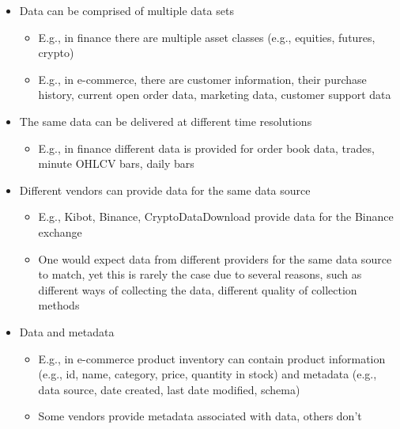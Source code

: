 \documentclass[11pt, reqno]{amsart}
\theoremstyle{definition}
\theoremstyle{remark}
\begin{document}
\begin{itemize}
\begin{itemize}
          \item Data can be comprised of multiple data sets
                \begin{itemize}
                  \item E.g., in finance there are multiple asset classes (e.g., equities,
                        futures, crypto)
                  \item E.g., in e-commerce, there are customer information, their
                        purchase history, current open order data, marketing data, customer
                        support data
                \end{itemize}

          \item The same data can be delivered at different time resolutions
                \begin{itemize}
                  \item E.g., in finance different data is provided for order book
                        data, trades, minute OHLCV bars, daily bars
                \end{itemize}

          \item Different vendors can provide data for the same data source
                \begin{itemize}
                  \item E.g., Kibot, Binance, CryptoDataDownload provide data for the
                        Binance exchange
                  \item One would expect data from different providers for the same
                        data source to match, yet this is rarely the case due to
                        several reasons, such as different ways of collecting the data,
                        different quality of collection methods
                \end{itemize}

          \item Data and metadata
                \begin{itemize}
                  \item E.g., in e-commerce product inventory can contain product
                        information (e.g., id, name, category, price, quantity in stock)
                        and metadata (e.g., data source, date created, last date modified,
                        schema)
                  \item Some vendors provide metadata associated with data, others don't
                \end{itemize}
        \end{itemize}
\end{itemize}
\end{document}
